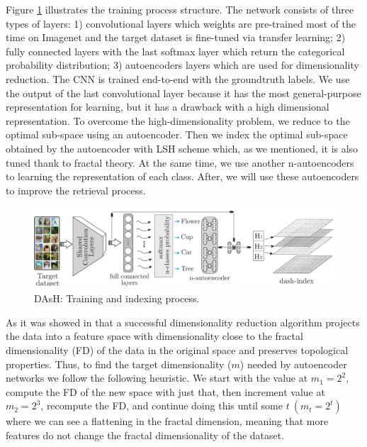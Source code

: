 \documentclass{article}
\begin{document}
Figure \ref{fig:dash} illustrates the training process structure. The network consists of three types of layers: 1) convolutional layers   which weights are   pre-trained most of the time on Imagenet and the target dataset is fine-tuned via transfer learning; 2)  fully connected layers with the last softmax layer which return the categorical probability distribution; 3) autoencoders layers which are used for dimensionality reduction. The \acf{CNN} is trained end-to-end with the groundtruth labels.  We use the output of the last convolutional layer because it has the most general-purpose representation for learning, but it has a drawback with a high dimensional representation.     To overcome the high-dimensionality problem,  we reduce to the optimal sub-space using an autoencoder.  Then we index the optimal sub-space obtained by the autoencoder with LSH scheme which, as we mentioned, it is also tuned thank to fractal theory.  At the same time, we use another n-autoencoders to learning the representation of each class. After, we will use these autoencoders to improve the retrieval process.   

\begin{figure}[htp]\centering
\includegraphics[width=1.7\columnwidth]{dash/DAsh_learning_final.pdf}
\caption{ DAsH: Training and indexing process. } 
\label{fig:dash}
\end{figure}       

As it was showed in \cite{citeulike:fractal:encoders} that a successful dimensionality reduction  algorithm projects the data into a feature space with dimensionality close to the fractal dimensionality (FD) of the data in the original space and preserves topological properties.  Thus, to find the target dimensionality ($m$) needed by  autoencoder networks we follow the following  heuristic.  We start with the value at $m_1 = 2^2$, compute the FD of the new space with just that, then increment  value at $m_2 = 2^3$, recompute the FD, and continue doing this until some $ t\ (m_t =  2 ^ t)$ where we can see a flattening in the fractal dimension, meaning that more features do not change the fractal dimensionality of the dataset. 
\end{document}

